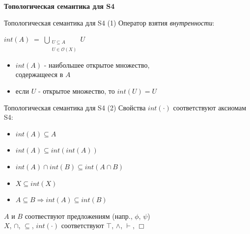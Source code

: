 \documentclass{beamer}
\begin{document}
\begin{frame}{}
\begin{center}
	\textbf{Топологическая семантика для S4}
\end{center}
\end{frame}

\begin{frame}{Топологическая семантика для S4 (1)}
Оператор взятия \textit{внутренности}:\\
\bigskip
\begin{center}
	    $\displaystyle int(A) \; = \; \bigcup_{\substack{U \subseteq A\\U \in \mathcal{O}(X)}}{U}$
\end{center}
\bigskip
\begin{itemize}
	\item $int(A)$ - наибольшее открытое множество, \\содержащееся в $A$
	\item если $U$ - открытое множество, то $int(U) = U$
\end{itemize}
\end{frame}

\begin{frame}{Топологическая семантика для S4 (2)}
Свойства $int(\cdot)$ соответствуют аксиомам S4:\\
\bigskip
\begin{itemize}
	\item $int(A) \subseteq A$
	\item $int(A) \subseteq int(int(A))$
	\item $int(A) \cap int(B) \subseteq int(A \cap B)$
	\item $X \subseteq int(X)$
	\item $A \subseteq B \Longrightarrow int(A) \subseteq int(B)$
\end{itemize}
\bigskip
\begin{footnotesize}
$A$ и $B$ соотвествуют предложениям (напр., $\phi$, $\psi$)\\
$X$, $\cap$, $\subseteq$, $int(\cdot)$ соответствуют $\top$, $\wedge$, $\vdash$, $\Box$
\end{footnotesize}
\end{frame}
\end{document}
